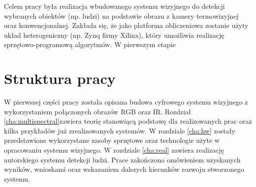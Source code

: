 Celem pracy była realizacja wbudowanego systemu wizyjnego do detekcji wybranych obiektów (np. ludzi) na podstawie obrazu z kamery termowizyjnej oraz konwencjonalnej. 
Zakłada się, że jako platforma obliczeniowa zostanie użyty układ heterogeniczny (np. Zynq firmy Xilinx), który umożliwia realizację sprzętowo-programową algorytmów. W pierwszym etapie 

\section{Struktura pracy}

W pierwszej części pracy została opisana budowa cyfrowego systemu wizyjnego z wykorzystaniem połączonych obrazów RGB oraz IR. 
Rozdział \ref{cha:multispectral}zawiera teorię stanowiącą podstawę dla realizowanych prac oraz kilka 
przykładów już zrealizowanych systemów. 
W rozdziale \ref{cha:hw} zostały przedstawione wykorzystane zasoby sprzętowe oraz technologie użyte w opracowaniu systemu wizyjnego.
W rozdziale \ref{cha:real} zawiera realizację autorskiego systemu detekcji ludzi. 
Prace zakończono omówieniem uzyskanych wyników, wnioskami oraz wskazaniem dalszych kierunków rozwoju stworzonego systemu.

